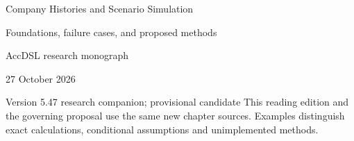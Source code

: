 \documentclass[11pt,a4paper]{report}
\begin{document}
\hypersetup{pageanchor=false}
\begin{titlepage}
{\Huge Company Histories and Scenario Simulation\par}
\vspace{12mm}
{\Large Foundations, failure cases, and proposed methods\par}
\vspace{8mm}
AccDSL research monograph\par 27 October 2026\par Version 5.47 research companion; provisional candidate
\vfill
This reading edition and the governing proposal use the same new chapter sources. Examples distinguish exact calculations, conditional assumptions and unimplemented methods.
\end{titlepage}
\hypersetup{pageanchor=true}
\tableofcontents
\clearpage{}


























\clearpage\label{sim:body-end}

\begingroup\raggedright
\endgroup
\end{document}
